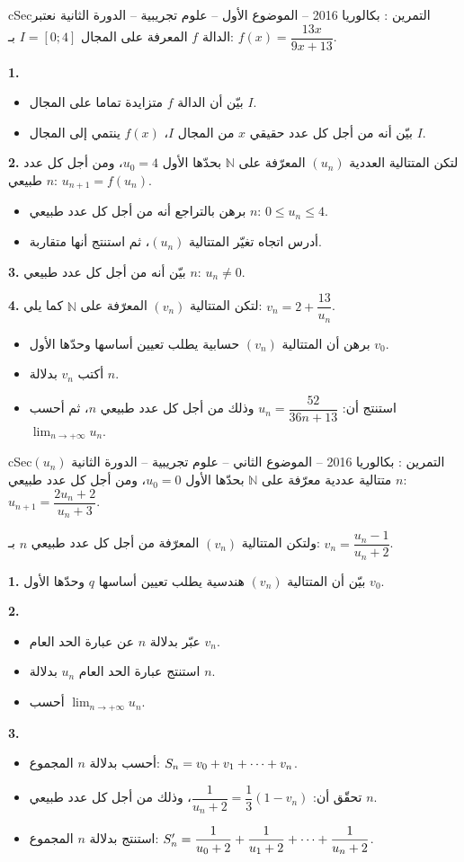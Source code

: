 \documentclass[12pt,a4paper]{article}
\newenvironment{BOX}[2]{\begin{otherlanguage}{english}\begin{arbox}{#1}{#2}}{\end{arbox}\end{otherlanguage}}
\newcounter{exo}
\newenvironment{tamrin}[1]{\stepcounter{exo}\begin{BOX}{cSec}{التمرين \theexo: #1}}{\end{BOX}}
\renewcommand{\cdots}{\mathinner{\cdotp\cdotp\cdotp}}
\newcommand{\N}{\mathbb{N}}
\newcommand{\limn}{\displaystyle\lim_{n\to+\infty}}
\newenvironment{sq}{\begin{itemize}[leftmargin=2.4em,itemsep=3pt]}{\end{itemize}}
\newcommand{\qa}{\item[(أ)]}\newcommand{\qb}{\item[(ب)]}\newcommand{\qc}{\item[(جـ)]}\newcommand{\qd}{\item[(د)]}\newcommand{\qe}{\item[(هـ)]}
\newcommand{\QQ}[1]{\par\smallskip\textbf{#1.} }
\begin{document}
\begin{tamrin}{بكالوريا 2016 -- الموضوع الأول -- علوم تجريبية -- الدورة الثانية}
نعتبر الدالة $f$ المعرفة على المجال $I=[0;4]$ بـ: $f(x)=\dfrac{13x}{9x+13}$.
\QQ{1}
\begin{sq}
\qa بيّن أن الدالة $f$ متزايدة تماما على المجال $I$.
\qb بيّن أنه من أجل كل عدد حقيقي $x$ من المجال $I$، $f(x)$ ينتمي إلى المجال $I$.
\end{sq}
\QQ{2} لتكن المتتالية العددية $(u_n)$ المعرّفة على $\N$ بحدّها الأول $u_0=4$، ومن أجل كل عدد طبيعي $n$: $u_{n+1}=f(u_n)$.
\begin{sq}
\qa برهن بالتراجع أنه من أجل كل عدد طبيعي $n$: $0\leqslant u_n\leqslant 4$.
\qb أدرس اتجاه تغيّر المتتالية $(u_n)$، ثم استنتج أنها متقاربة.
\end{sq}
\QQ{3} بيّن أنه من أجل كل عدد طبيعي $n$: $u_n\neq 0$.
\QQ{4} لتكن المتتالية $(v_n)$ المعرّفة على $\N$ كما يلي: $v_n=2+\dfrac{13}{u_n}$.
\begin{sq}
\qa برهن أن المتتالية $(v_n)$ حسابية يطلب تعيين أساسها وحدّها الأول $v_0$.
\qb أكتب $v_n$ بدلالة $n$.
\qc استنتج أن: $u_n=\dfrac{52}{36n+13}$ وذلك من أجل كل عدد طبيعي $n$، ثم أحسب $\limn u_n$.
\end{sq}
\end{tamrin}

\begin{tamrin}{بكالوريا 2016 -- الموضوع الثاني -- علوم تجريبية -- الدورة الثانية}
$(u_n)$ متتالية عددية معرّفة على $\N$ بحدّها الأول $u_0=0$، ومن أجل كل عدد طبيعي $n$: $u_{n+1}=\dfrac{2u_n+2}{u_n+3}$.

ولتكن المتتالية $(v_n)$ المعرّفة من أجل كل عدد طبيعي $n$ بـ: $v_n=\dfrac{u_n-1}{u_n+2}$.
\QQ{1} بيّن أن المتتالية $(v_n)$ هندسية يطلب تعيين أساسها $q$ وحدّها الأول $v_0$.
\QQ{2}
\begin{sq}
\qa عبّر بدلالة $n$ عن عبارة الحد العام $v_n$.
\qb استنتج عبارة الحد العام $u_n$ بدلالة $n$.
\qc أحسب $\limn u_n$.
\end{sq}
\QQ{3}
\begin{sq}
\qa أحسب بدلالة $n$ المجموع: $S_n=v_0+v_1+\cdots+v_n$.
\qb تحقّق أن: $\dfrac{1}{u_n+2}=\dfrac13(1-v_n)$، وذلك من أجل كل عدد طبيعي $n$.
\qc استنتج بدلالة $n$ المجموع: $S'_n=\dfrac{1}{u_0+2}+\dfrac{1}{u_1+2}+\cdots+\dfrac{1}{u_n+2}$.
\end{sq}
\end{tamrin}
\end{document}
